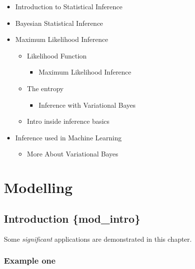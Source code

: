 \documentclass[]{book}
\providecommand{\tightlist}{%
  \setlength{\itemsep}{0pt}\setlength{\parskip}{0pt}}
\begin{document}
\begin{itemize}
\tightlist
\item
  Introduction to Statistical Inference
\item
  Bayesian Statistical Inference
\item
  Maximum Likelihood Inference

  \begin{itemize}
  \tightlist
  \item
    Likelihood Function

    \begin{itemize}
    \tightlist
    \item
      Maximum Likelihood Inference
    \end{itemize}
  \item
    The entropy

    \begin{itemize}
    \tightlist
    \item
      Inference with Variational Bayes
    \end{itemize}
  \item
    Intro inside inference basics
  \end{itemize}
\item
  Inference used in Machine Learning

  \begin{itemize}
  \tightlist
  \item
    More About Variational Bayes
  \end{itemize}
\end{itemize}

\hypertarget{part-modelling}{%
\part{Modelling}\label{part-modelling}}

\hypertarget{introduction-mod_intro}{%
\chapter{Introduction \{mod\_intro\}}\label{introduction-mod_intro}}

Some \emph{significant} applications are demonstrated in this chapter.

\hypertarget{example-one}{%
\section{Example one}\label{example-one}}
\end{document}
